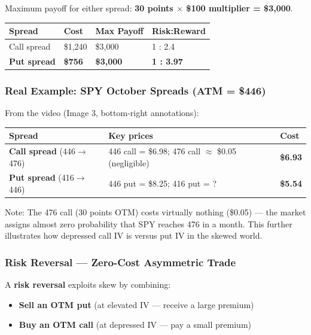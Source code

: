 \documentclass[12pt,openany]{book}
\begin{document}
Maximum payoff for either spread: \textbf{30 points \(\times\) \$100 multiplier = \$3,000}.

\begin{center}
\scriptsize
\setlength{\tabcolsep}{3pt}
\begin{tabular}{|L{3.0cm}|L{3.0cm}|L{3.0cm}|L{3.0cm}|}
\hline
\textbf{Spread} & \textbf{Cost} & \textbf{Max Payoff} & \textbf{Risk:Reward} \\
\hline
Call spread & \$1,240 & \$3,000 & 1 : 2.4 \\
\hline
\textbf{Put spread} & \textbf{\$756} & \textbf{\$3,000} & \textbf{1 : 3.97} \\
\hline
\end{tabular}
\end{center}

\subsubsection{Real Example: SPY October Spreads (ATM = \$446)}

From the video (Image 3, bottom-right annotations):

\begin{center}
\scriptsize
\setlength{\tabcolsep}{3pt}
\begin{tabular}{|L{4.1cm}|L{4.1cm}|L{4.1cm}|}
\hline
\textbf{Spread} & \textbf{Key prices} & \textbf{Cost} \\
\hline
\textbf{Call spread} (446\(\rightarrow\)476) & 446 call = \$6.98; 476 call \(\approx\) \$0.05 (negligible) & \textbf{\$6.93} \\
\hline
\textbf{Put spread} (416\(\rightarrow\)446) & 446 put = \$8.25; 416 put = ? & \textbf{\$5.54} \\
\hline
\end{tabular}
\end{center}

Note: The 476 call (30 points OTM) costs virtually nothing (\$0.05) — the market assigns almost zero probability that SPY reaches 476 in a month. This further illustrates how depressed call IV is versus put IV in the skewed world.

\subsubsection{Risk Reversal — Zero-Cost Asymmetric Trade}

A \textbf{risk reversal} exploits skew by combining:
\begin{itemize}[leftmargin=*]
    \item \textbf{Sell an OTM put} (at elevated IV — receive a large premium)
    \item \textbf{Buy an OTM call} (at depressed IV — pay a small premium)
\end{itemize}
\end{document}
